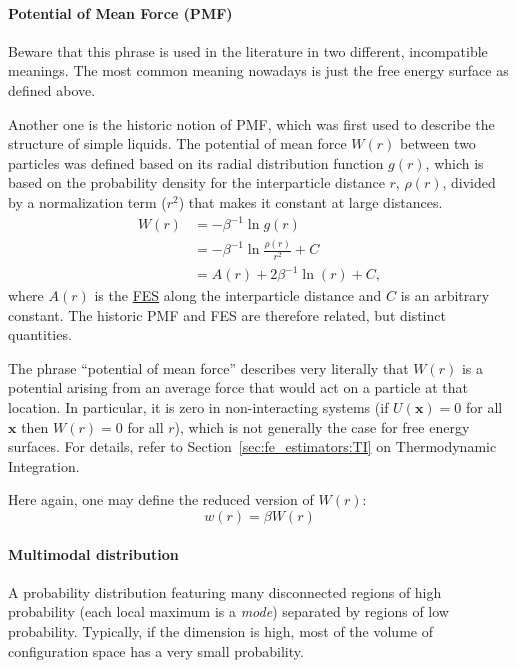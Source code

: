 \documentclass[9pt,review]{livecoms}
\newcommand{\vx}{\mathbf{x}}
\begin{document}
\paragraph{Potential of Mean Force (PMF)}
Beware that this phrase is used in the literature in two different, incompatible meanings. The most common meaning nowadays is just the free energy surface as defined above.

Another one is the historic notion of PMF, which was first used to describe the structure of simple liquids.
The potential of mean force $W(r)$ between two particles was defined based on its radial distribution function $g(r)$, which is based on the probability density for the interparticle distance $r$, $\rho(r)$, divided by a normalization term ($r^2$) that makes it constant at large distances.
\begin{align}
    W(r) &= -\beta^{-1} \ln g(r) \nonumber \\
    &= -\beta^{-1} \ln \frac{\rho(r)}{r^2} + C  \nonumber \\
    &= A(r) + 2 \beta^{-1} \ln(r) + C,
    \label{eq:pmf_fes}
\end{align}
where $A(r)$ is the \hyperlink{ref:FES} {FES} along the interparticle distance and $C$ is an arbitrary constant.
The historic PMF and FES are therefore related, but distinct quantities.

The phrase ``potential of mean force'' describes very literally that $W(r)$ is a potential arising from an average force that would act on a particle at that location. In particular, it is zero in non-interacting systems (if $U(\vx) = 0$ for all $\vx$ then $W(r) = 0$ for all $r$), which is not generally the case for free energy surfaces.
For details, refer to Section~\ref{sec:fe_estimators:TI} on Thermodynamic Integration.

Here again, one may define the reduced version of $W(r)$:
\begin{equation}
    w(r) = \beta W(r)
\end{equation}

\paragraph{Multimodal distribution}

A probability distribution featuring many disconnected regions of high probability (each local maximum is a \textit{mode}) separated by regions of low probability. Typically, if the dimension is high, most of the volume of configuration space has a very small probability.
\end{document}
